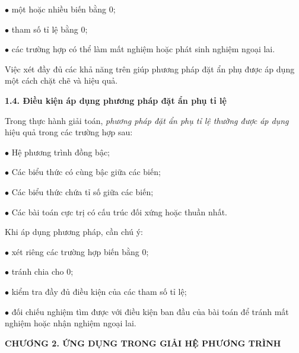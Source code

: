 \documentclass[12pt]{report}
\begin{document}
\vspace{0.2cm}
\noindent $\bullet$ một hoặc nhiều biến bằng 0;

\vspace{0.1cm}
\noindent $\bullet$ tham số tỉ lệ bằng 0;

\vspace{0.1cm}
\noindent $\bullet$ các trường hợp có thể làm mất nghiệm hoặc phát sinh nghiệm ngoại lai.

\vspace{0.2cm}
\noindent Việc xét đầy đủ các khả năng trên giúp phương pháp đặt ẩn phụ được áp dụng một cách chặt chẽ và hiệu quả.

\vspace{0.4cm}
\noindent \textbf{1.4. Điều kiện áp dụng phương pháp đặt ẩn phụ tỉ lệ}

\noindent Trong thực hành giải toán, \textit{phương pháp đặt ẩn phụ tỉ lệ thường được áp dụng} hiệu quả trong các trường hợp sau:

\vspace{0.2cm}
\noindent $\bullet$ Hệ phương trình đồng bậc;

\vspace{0.1cm}
\noindent $\bullet$ Các biểu thức có cùng bậc giữa các biến;

\vspace{0.1cm}
\noindent $\bullet$ Các biểu thức chứa tỉ số giữa các biến;

\vspace{0.1cm}
\noindent $\bullet$ Các bài toán cực trị có cấu trúc đối xứng hoặc thuần nhất.

\vspace{0.3cm}
\noindent Khi áp dụng phương pháp, cần chú ý:

\vspace{0.2cm}
\noindent $\bullet$ xét riêng các trường hợp biến bằng 0;

\vspace{0.1cm}
\noindent $\bullet$ tránh chia cho 0;

\vspace{0.1cm}
\noindent $\bullet$ kiểm tra đầy đủ điều kiện của các tham số tỉ lệ;

\vspace{0.1cm}
\noindent $\bullet$ đối chiếu nghiệm tìm được với điều kiện ban đầu của bài toán để tránh mất nghiệm hoặc nhận nghiệm ngoại lai.

\vspace{0.3cm}
\newpage
\noindent \textbf{CHƯƠNG 2. ỨNG DỤNG TRONG GIẢI HỆ PHƯƠNG TRÌNH}
\end{document}
